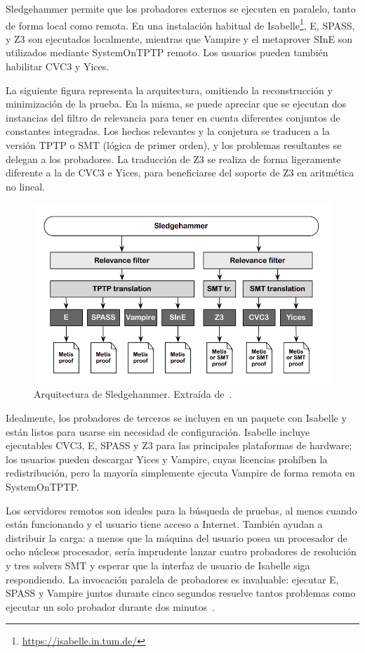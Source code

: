 \documentclass[12pt]{book}
\begin{document}
Sledgehammer permite que los probadores externos se ejecuten en paralelo, tanto de forma local como remota. En una instalación habitual de Isabelle\footnote{\url{https://isabelle.in.tum.de/}}, E, SPASS, y Z3 son ejecutados localmente, mientras que Vampire y el metaprover SInE son utilizados mediante SystemOnTPTP remoto. Los usuarios pueden también habilitar CVC3 y Yices.

La siguiente figura representa la arquitectura, omitiendo la reconstrucción y minimización de la prueba. En la misma, se puede apreciar que se ejecutan dos instancias del filtro de relevancia para tener en cuenta diferentes conjuntos de constantes integradas. Los hechos relevantes y la conjetura se traducen a la versión TPTP o SMT (lógica de primer orden), y los problemas resultantes se delegan a los probadores. La traducción de Z3 se realiza de forma ligeramente diferente a la de CVC3 e Yices, para beneficiarse del soporte de Z3 en aritmética no lineal.

\begin{figure}[H]
	\centering
	\includegraphics[width=\textwidth]{Sledgehammer_arquitecture.png}
	\caption{Arquitectura de Sledgehammer. Extraída de~\cite{proof_and_disproof}.}\label{fig:Sledgehammer_arquitecture.}
\end{figure}

Idealmente, los probadores de terceros se incluyen en un paquete con Isabelle y están listos para usarse sin necesidad de configuración. Isabelle incluye ejecutables CVC3, E, SPASS y Z3 para las principales plataformas de hardware; los usuarios pueden descargar Yices y Vampire, cuyas licencias prohíben la redistribución, pero la mayoría simplemente ejecuta Vampire de forma remota en SystemOnTPTP.\@

Los servidores remotos son ideales para la búsqueda de pruebas, al menos cuando están funcionando y el usuario tiene acceso a Internet. También ayudan a distribuir la carga: a menos que la máquina del usuario posea un procesador de ocho núcleos procesador, sería imprudente lanzar cuatro probadores de resolución y tres solvers SMT y esperar que la interfaz de usuario de Isabelle siga respondiendo. La invocación paralela de probadores es invaluable: ejecutar E, SPASS y Vampire juntos durante cinco segundos resuelve tantos problemas como ejecutar un solo probador durante dos minutos~\cite{sledgehammer_judgement_day}.
\end{document}
